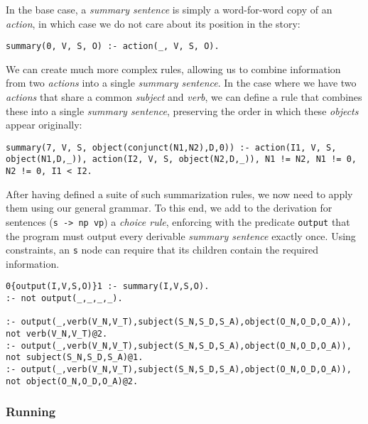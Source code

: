 In the base case, a \textit{summary sentence} is simply a word-for-word copy of an \textit{action}, in which case we do not care about its position in the story:

\begin{displayquote}
\begin{lstlisting}[numbers=none]
summary(0, V, S, O) :- action(_, V, S, O).
\end{lstlisting}
\end{displayquote}

We can create much more complex rules, allowing us to combine information from two \textit{actions} into a single \textit{summary sentence}. In the case where we have two \textit{actions} that share a common \textit{subject} and \textit{verb}, we can define a rule that combines these into a single \textit{summary sentence}, preserving the order in which these \textit{objects} appear originally:

\begin{displayquote}
\begin{lstlisting}[numbers=none]
summary(7, V, S, object(conjunct(N1,N2),D,0)) :- action(I1, V, S, object(N1,D,_)), action(I2, V, S, object(N2,D,_)), N1 != N2, N1 != 0, N2 != 0, I1 < I2.
\end{lstlisting}
\end{displayquote}

After having defined a suite of such summarization rules, we now need to apply them using our general grammar. To this end, we add to the derivation for sentences (\texttt{s -> np vp}) a \textit{choice rule}, enforcing with the predicate \texttt{output} that the program must output every derivable \textit{summary sentence} exactly once. Using constraints, an \texttt{s} node can require that its children contain the required information.

\begin{displayquote}
\begin{lstlisting}
0{output(I,V,S,O)}1 :- summary(I,V,S,O).
:- not output(_,_,_,_).

:- output(_,verb(V_N,V_T),subject(S_N,S_D,S_A),object(O_N,O_D,O_A)), not verb(V_N,V_T)@2.
:- output(_,verb(V_N,V_T),subject(S_N,S_D,S_A),object(O_N,O_D,O_A)), not subject(S_N,S_D,S_A)@1.
:- output(_,verb(V_N,V_T),subject(S_N,S_D,S_A),object(O_N,O_D,O_A)), not object(O_N,O_D,O_A)@2.
\end{lstlisting}
\end{displayquote}

\subsubsection{Running}

